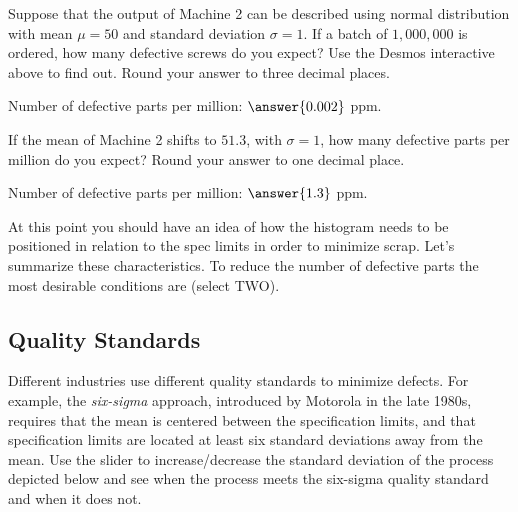 \documentclass{ximera}
\begin{document}
\begin{onlineOnly}
\begin{center} 
\end{center}
\end{onlineOnly}

\begin{question}\label{ex:defParts3}
    Suppose that the output of Machine 2 can be described using normal distribution with mean $\mu=50$ and standard deviation $\sigma=1$.  If a batch of $1,000,000$ is ordered, how many defective screws do you expect?  Use the Desmos interactive above to find out.  Round your answer to three decimal places.

    Number of defective parts per million: $\answer{0.002}$ ppm.

    If the mean of Machine 2 shifts to $51.3$, with $\sigma =1$, how many defective parts per million do you expect?  Round your answer to one decimal place.

    Number of defective parts per million: $\answer{1.3}$ ppm.
\end{question}

\begin{question}\label{prob:specs1}
At this point you should have an idea of how the histogram needs to be positioned in relation to the spec limits in order to minimize scrap.  Let's summarize these characteristics.  To reduce the number of defective parts the most desirable conditions are (select TWO).

    \begin{selectAll}
    \end{selectAll}
\end{question}

\subsection*{Quality Standards}
Different industries use different quality standards to minimize defects.  For example, the \emph{six-sigma} approach, introduced by Motorola in the late 1980s, requires that the mean is centered between the specification limits, and that specification limits are located at least six standard deviations away from the mean.  Use the slider to increase/decrease the standard deviation of the process depicted below and see when the process meets the six-sigma quality standard and when it does not.
\end{document}
